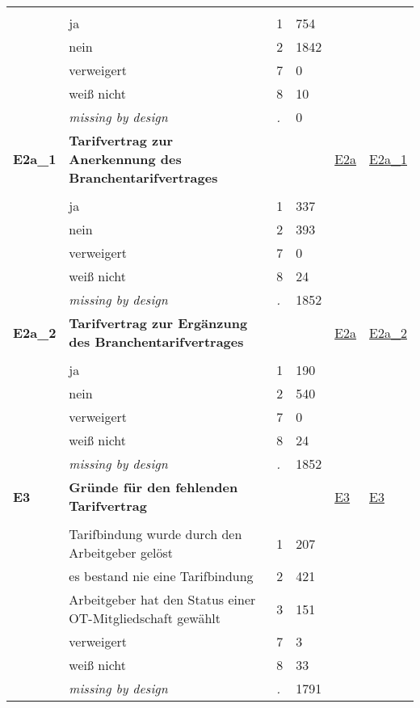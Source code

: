 \begin{longtable}{| L{2.45cm} | L{6cm} | C{1.5cm} | R{1cm} | C{2.25cm} | C{2.25cm} |}
   &  &  &  &  &  \\ 
   & ja & 1 & 754 &  &  \\ 
   & nein & 2 & 1842 &  &  \\ 
   & verweigert & 7 & 0 &  &  \\ 
   & weiß nicht & 8 & 10 &  &  \\ 
   & \textit{missing by design} & \textit{.} & 0 &  &  \\ 
   \midrule
\textbf{E2a\_1}\label{var:E2a:1} & \textbf{Tarifvertrag zur Anerkennung des Branchentarifvertrages} &  &  & \hyperref[E2a]{E2a} & \hyperref[var:suf:E2a:1]{E2a\_1} \\ 
   &  &  &  &  &  \\ 
   & ja & 1 & 337 &  &  \\ 
   & nein & 2 & 393 &  &  \\ 
   & verweigert & 7 & 0 &  &  \\ 
   & weiß nicht & 8 & 24 &  &  \\ 
   & \textit{missing by design} & \textit{.} & 1852 &  &  \\ 
   \midrule
\textbf{E2a\_2}\label{var:E2a:2} & \textbf{Tarifvertrag zur Ergänzung des Branchentarifvertrages} &  &  & \hyperref[E2a]{E2a} & \hyperref[var:suf:E2a:2]{E2a\_2} \\ 
   &  &  &  &  &  \\ 
   & ja & 1 & 190 &  &  \\ 
   & nein & 2 & 540 &  &  \\ 
   & verweigert & 7 & 0 &  &  \\ 
   & weiß nicht & 8 & 24 &  &  \\ 
   & \textit{missing by design} & \textit{.} & 1852 &  &  \\ 
   \midrule
\textbf{E3}\label{var:E3} & \textbf{Gründe für den fehlenden Tarifvertrag} &  &  & \hyperref[E3]{E3} & \hyperref[var:suf:E3]{E3} \\ 
   &  &  &  &  &  \\ 
   & Tarifbindung wurde durch den Arbeitgeber gelöst & 1 & 207 &  &  \\ 
   & es bestand nie eine Tarifbindung & 2 & 421 &  &  \\ 
   & Arbeitgeber hat den Status einer OT-Mitgliedschaft gewählt & 3 & 151 &  &  \\ 
   & verweigert & 7 & 3 &  &  \\ 
   & weiß nicht & 8 & 33 &  &  \\ 
   & \textit{missing by design} & \textit{.} & 1791 &  &  \\ 

\end{longtable}
